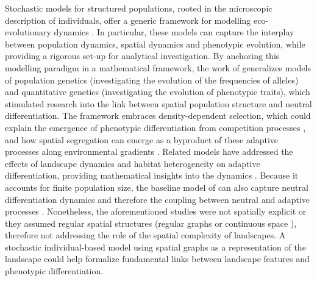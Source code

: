 Stochastic models for structured populations, rooted in the microscopic description of individuals, offer a generic framework for modelling eco-evolutionary dynamics \citep{Champagnat2006,Bansaye2015}. 
%
In particular, these models can capture the interplay between population dynamics, spatial dynamics and phenotypic evolution, while providing a rigorous set-up for analytical investigation. 
%
By anchoring this modelling paradigm in a mathematical framework, the work of \cite{Champagnat2006} generalizes models of population genetics \citep{Burger2000} (investigating the evolution of the frequencies of alleles) and quantitative genetics \citep{Slatkin1978,Lande1991,Nagylaki1994} (investigating the evolution of phenotypic traits), which stimulated research into the link between spatial population structure and neutral differentiation. 
%
The framework embraces density-dependent selection, which could explain the emergence of phenotypic differentiation from competition processes \citep{Dieckmann1999}, and how spatial segregation can emerge as a byproduct of these adaptive processes along environmental gradients \citep{Doebeli2003}. Related models have addressed the effects of landscape dynamics and habitat heterogeneity on adaptive differentiation, providing mathematical insights into the dynamics \citep{Meszena1997,Aguilee2012,Debarre2013,Wickman2017,Polechova2018,Mirrahimi2020}. 
%
Because it accounts for finite population size, the baseline model of \cite{Champagnat2006} can also capture neutral differentiation dynamics and therefore the coupling between neutral and adaptive processes \citep{Billiard2015,Anceschi2019}.
%
Nonetheless, the aforementioned studies were not spatially explicit \citep{Billiard2015,Anceschi2019} or they assumed regular spatial structures (regular graphs \citep{Meszena1997,Aguilee2012,Debarre2013,Mirrahimi2020} or continuous space \citep{Doebeli2003,Wickman2017,Polechova2018}), therefore not addressing the role of the spatial complexity of landscapes.
%
A stochastic individual-based model using spatial graphs as a representation of the landscape could help formalize fundamental links between landscape features and phenotypic differentiation.

